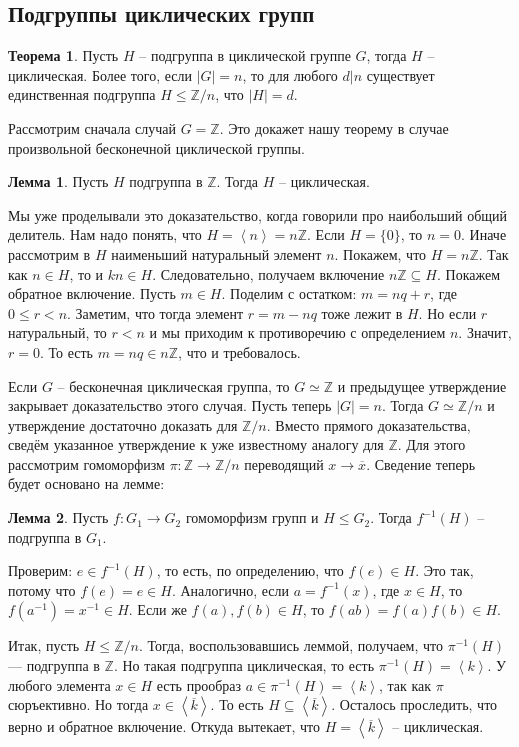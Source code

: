 \documentclass[10pt,a4paper,oneside]{book}
\theoremstyle{definition}
\newtheorem{thm}{\color{red!40!black}Теорема}
\newtheorem{lem}{\color{green!50!black}Лемма}
\renewcommand{\leq}{\leqslant}
\newcommand{\mb}[1]{\mathbb{#1}}
\newcommand{\ovl}{\overline}
\def\lan{\left\langle }
\def\ran{\right\rangle}
\def\thrm{\begin{thm}}
\def\ethrm{\end{thm}}
\def\lm{\begin{lem}}
\def\elm{\end{lem}}
\begin{document}
\subsection{Подгруппы циклических групп}



\thrm Пусть $H$ -- подгруппа в циклической группе $G$, тогда $H$ -- циклическая. Более того, если $|G|=n$, то для любого $d|n$ существует единственная подгруппа $H\leq \mb Z/n$, что $|H|=d$. 
\ethrm
\proof

Рассмотрим сначала случай $G=\mb Z$. Это докажет нашу теорему в случае произвольной бесконечной циклической группы.

\lm Пусть $H$ подгруппа в $\mb Z$. Тогда $H$ -- циклическая.
\elm
\proof Мы уже проделывали это доказательство, когда говорили про наибольший общий делитель. Нам надо понять, что $H=\lan n\ran =n\mb Z$. Если $H=\{0\}$, то $n=0$. Иначе рассмотрим в $H$ наименьший натуральный элемент $n$. Покажем, что $H=n\mb Z$. Так как $n \in H$, то и $kn \in H$. Следовательно, получаем включение $n\mb Z \subseteq H$. Покажем обратное включение. Пусть $m\in H$. Поделим с остатком: $m=nq+r$, где $0\leq r<n$. Заметим, что тогда элемент $r=m-nq$ тоже лежит в $H$. Но если $r$ натуральный, то $r<n$ и мы приходим к противоречию с определением $n$. Значит,  $r=0$. То есть $m=nq \in n \mb Z$, что и требовалось. 
\endproof

Если $G$ -- бесконечная циклическая группа, то $G \simeq \mb Z$ и предыдущее утверждение закрывает доказательство этого случая. Пусть теперь $|G|=n$. Тогда $G\simeq \mb Z/n$ и утверждение достаточно доказать для $\mb Z/n$. Вместо прямого доказательства, сведём указанное утверждение к уже известному аналогу для $\mb Z$. Для этого рассмотрим гомоморфизм $\pi\colon \mb Z \to \mb Z/n$ переводящий $x\to \ovl{x}$. Сведение теперь будет основано на лемме:

\lm Пусть $f\colon G_1\to G_2$ гомоморфизм групп и $H\leq G_2$. Тогда $f^{-1}(H)$ -- подгруппа в $G_1$.
\elm
\proof Проверим: $e \in f^{-1}(H)$, то есть, по определению, что $f(e)\in H$. Это так, потому что $f(e)=e\in H$. Аналогично, если $a=f^{-1}(x)$, где $x \in H$, то $f(a^{-1})=x^{-1}\in H$. Если же $f(a), f(b) \in H$, то $f(ab)=f(a)f(b)\in H$. 
\endproof

Итак, пусть $H\leq \mb Z/n$. Тогда, воспользовавшись леммой, получаем, что  $\pi^{-1}(H)$ ---  подгруппа в $\mb Z$. Но такая подгруппа циклическая, то есть $\pi^{-1}(H)=\lan k \ran$. У любого элемента $x\in H$ есть прообраз $a\in \pi^{-1}(H)=\lan k \ran$, так как $\pi$ сюръективно. Но тогда $x\in \lan \ovl{k} \ran$. То есть $H\subseteq \lan \ovl{k}\ran$. Осталось проследить, что верно и обратное включение. Откуда вытекает, что $H=\lan \ovl{k}\ran$ -- циклическая.
\end{document}
